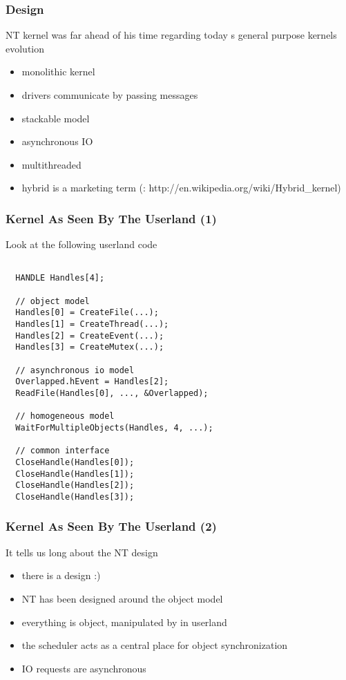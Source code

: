\begin{frame}
  \frametitle{Design}

  NT kernel was far ahead of his time regarding today s general purpose kernels evolution

  \begin{itemize}
    \item
      monolithic kernel
    \item
      drivers communicate by passing messages
    \item
      stackable model
    \item
      asynchronous IO
    \item
      multithreaded
    \item
      hybrid is a marketing term (: http://en.wikipedia.org/wiki/Hybrid\_kernel)
  \end{itemize}

\end{frame}


\begin{frame}[containsverbatim]
  \frametitle{Kernel As Seen By The Userland (1)}
   
  Look at the following userland code

  \begin{verbatim}

  HANDLE Handles[4];

  // object model
  Handles[0] = CreateFile(...);
  Handles[1] = CreateThread(...);
  Handles[2] = CreateEvent(...);
  Handles[3] = CreateMutex(...);

  // asynchronous io model
  Overlapped.hEvent = Handles[2];
  ReadFile(Handles[0], ..., &Overlapped);

  // homogeneous model
  WaitForMultipleObjects(Handles, 4, ...);

  // common interface
  CloseHandle(Handles[0]);
  CloseHandle(Handles[1]);
  CloseHandle(Handles[2]);
  CloseHandle(Handles[3]);

  \end{verbatim}
  
\end{frame}

\begin{frame}
  \frametitle{Kernel As Seen By The Userland (2)}

 It tells us long about the NT design

 \begin{itemize}
   \item
     there is a design :)
   \item
     NT has been designed around the object model
   \item
     everything is object, manipulated by  in userland
   \item
     the scheduler acts as a central place for object synchronization
   \item
     IO requests are asynchronous
 \end{itemize}

\end{frame}


